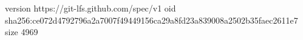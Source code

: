version https://git-lfs.github.com/spec/v1
oid sha256:ce072d4792796a2a7007f49449156ca29a8fd23a839008a2502b35faec2611e7
size 4969
